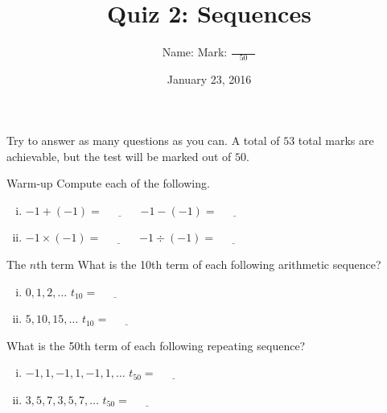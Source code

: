 \documentclass[12pt,letterpaper]{article}
\title{Quiz 2: Sequences}
\author{Name: \underline{\hspace{5cm}}
Mark: $\displaystyle \frac{\hspace{3em}}{50}$}
\date{January 23, 2016}
\begin{document}
\maketitle

Try to answer as many questions as you can. A total of $53$ total marks are
achievable, but the test will be marked out of $50$.

\thispagestyle{empty}

\begin{problem}{Warm-up}
 Compute each of the following.

 \begin{enumerate}[i.]
  \item $-1+(-1)=\underline{\hspace{3em}}$
  \hfill $-1-(-1)=\underline{\hspace{3em}}$
  \item $-1\times(-1)=\underline{\hspace{3em}}$
  \hfill $-1\div(-1)=\underline{\hspace{3em}}$
 \end{enumerate}
\end{problem}

\begin{problem}{The $n$th term}
 What is the 10th term of each following arithmetic sequence?

 \begin{enumerate}[i.]
  \item $0, 1, 2, \dots$ \hfill $t_{10} = \underline{\hspace{3em}}$
  \item $5, 10, 15, \dots$ \hfill $t_{10} = \underline{\hspace{3em}}$
 \end{enumerate}

 \noindent What is the 50th term of each following repeating sequence?

 \begin{enumerate}[i.]
  \item $-1, 1, -1, 1, -1, 1, \dots$ \hfill $t_{50} = \underline{\hspace{3em}}$
  \item $3, 5, 7, 3, 5, 7, \dots$ \hfill $t_{50} = \underline{\hspace{3em}}$
 \end{enumerate}
\end{problem}
\end{document}
